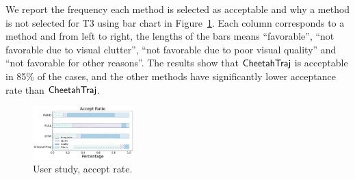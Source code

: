 
We report the frequency each method is selected as acceptable and why a method is not selected for T3 using bar chart in Figure~\ref{fig:accept_rate}. Each column corresponds to a method and from left to right, the lengths of the bars means ``favorable'', ``not favorable due to visual clutter'', ``not favorable due to poor visual quality'' and ``not favorable for other reasons''. The results show that $\mathsf{CheetahTraj}$ is acceptable in 85\% of the cases, and the other methods have significantly lower acceptance rate than $\mathsf{CheetahTraj}$.      




\begin{figure}[t]
	\centering
	\includegraphics[width=0.35\textwidth]{pictures/user_study/accept_rate.png}
	\caption{User study, accept rate.}
	\label{fig:accept_rate}
\end{figure}





